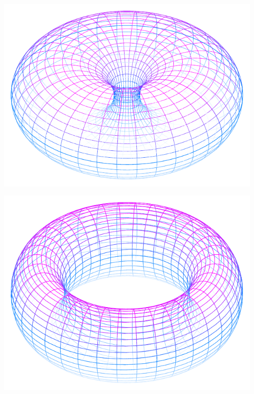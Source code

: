 \documentclass[11pt,openany]{article}
\begin{document}
\vfill
\begin{center}
\begin{minipage}{.32\textwidth}\centering
	\includegraphics[scale=.525]{../tikz/grad-math-tikz-pdf/torus4.pdf}
\end{minipage}\hfill
\begin{minipage}{.32\textwidth}\centering
	\includegraphics[scale=.525]{../tikz/grad-math-tikz-pdf/torus.pdf}
\end{minipage}\hfill
\begin{minipage}{.32\textwidth}\centering

\end{minipage}
\end{center}
\end{document}
